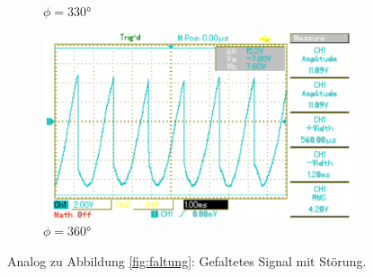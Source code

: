 \begin{figure}[p]
\begin{subfigure}{0.32\textwidth}
		\caption{$\phi=330°$}
	\end{subfigure}
	\begin{subfigure}{0.32\textwidth}
		\includegraphics[width=\textwidth]{Bilder/MAP030.pdf}
		\caption{$\phi=360°$}
	\end{subfigure}
	\caption{Analog zu Abbildung \ref{fig:faltung}: Gefaltetes Signal mit Störung. \cite{gimp}}
	\label{fig:faltungstoerung}
\end{figure}

